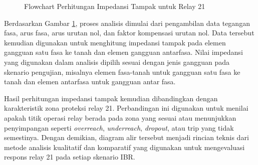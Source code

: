 \begin{figure}[H]
{%
    }
    \caption{Flowchart Perhitungan Impedansi Tampak untuk Relay 21}
    \label{fig:flowchart_impedansi_tampak_relay21}
\end{figure}

Berdasarkan Gambar \ref{fig:flowchart_impedansi_tampak_relay21}, proses analisis dimulai dari pengambilan data tegangan fasa, arus fasa, arus urutan nol, dan faktor kompensasi urutan nol. Data tersebut kemudian digunakan untuk menghitung impedansi tampak pada elemen gangguan satu fasa ke tanah dan elemen gangguan antarfasa. Nilai impedansi yang digunakan dalam analisis dipilih sesuai dengan jenis gangguan pada skenario pengujian, misalnya elemen fasa-tanah untuk gangguan satu fasa ke tanah dan elemen antarfasa untuk gangguan antar fasa.

Hasil perhitungan impedansi tampak kemudian dibandingkan dengan karakteristik zona proteksi relay 21. Perbandingan ini digunakan untuk menilai apakah titik operasi relay berada pada zona yang sesuai atau menunjukkan penyimpangan seperti \textit{overreach}, \textit{underreach}, \textit{dropout}, atau trip yang tidak semestinya. Dengan demikian, diagram alir tersebut menjadi rincian teknis dari metode analisis kualitatif dan komparatif yang digunakan untuk mengevaluasi respons relay 21 pada setiap skenario IBR.
